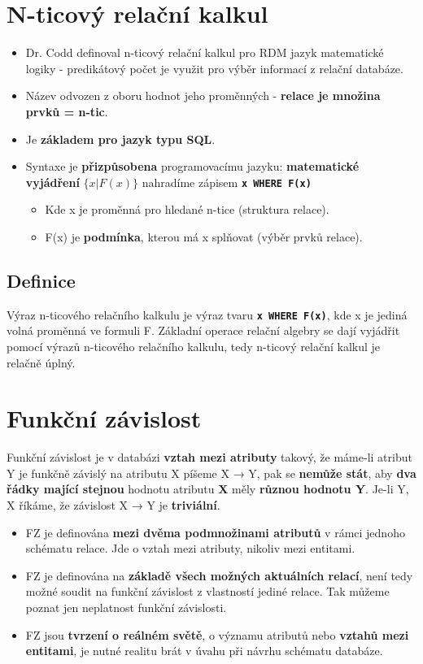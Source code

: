 \section{N-ticový relační kalkul}
\begin{itemize}
    \item Dr. Codd definoval n-ticový relační kalkul pro RDM jazyk matematické logiky - predikátový počet je využit pro výběr informací z relační databáze.
    \item Název odvozen z oboru hodnot jeho proměnných - \textbf{relace je množina prvků = n-tic}.
    \item Je \textbf{základem pro jazyk typu SQL}.
    \item Syntaxe je \textbf{přizpůsobena} programovacímu jazyku: \textbf{matematické vyjádření} $\{ x | F(x) \}$ nahradíme zápisem \textbf{\texttt{x WHERE  F(x)}}
          \begin{itemize}
              \item Kde x je proměnná pro hledané n-tice (struktura relace).
              \item F(x) je \textbf{podmínka}, kterou má x splňovat (výběr prvků relace).
          \end{itemize}
\end{itemize}

\subsection{Definice}
Výraz n-ticového relačního kalkulu je výraz tvaru \textbf{\texttt{x WHERE F(x)}}, kde x je jediná volná proměnná ve formuli F. Základní operace relační algebry se dají vyjádřit pomocí výrazů n-ticového relačního kalkulu, tedy n-ticový relační kalkul je relačně úplný.

\noindent{}


\section{Funkční závislost}
Funkční závislost je v databázi \textbf{vztah mezi atributy} takový, že máme-li atribut Y je funkčně závislý na atributu X píšeme X → Y, pak se \textbf{nemůže stát}, aby \textbf{dva řádky mající stejnou} hodnotu atributu \textbf{X} měly \textbf{různou hodnotu Y}. Je-li Y, X říkáme, že závislost X → Y je \textbf{triviální}.
\begin{itemize}
    \item FZ je definována \textbf{mezi dvěma podmnožinami atributů} v rámci jednoho schématu relace. Jde o vztah mezi atributy, nikoliv mezi entitami.
    \item FZ je definována na \textbf{základě všech možných aktuálních relací}, není tedy možné soudit na funkční závislost z vlastností jediné relace. Tak můžeme poznat jen neplatnost funkční závislosti.
    \item FZ jsou \textbf{tvrzení o reálném světě}, o významu atributů nebo \textbf{vztahů mezi entitami}, je nutné realitu brát v úvahu při návrhu schématu databáze.
\end{itemize}


